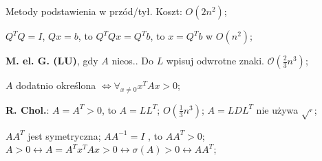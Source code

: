 
\entry
Metody podstawienia w przód/tył. Koszt: $O(2n^2)$;

\entry
$Q^TQ=I$, $Qx=b$, to $Q^TQx=Q^Tb$, to $x=Q^Tb$ w $O(n^2)$;




\entry
\textbf{M. el. G. (LU)}, gdy $A$ nieos..
Do $L$ wpisuj odwrotne znaki.
$\mathcal{O}(\frac{2}{3}n^3)$;

\entry
$A$ dodatnio określona $\iff \forall_{x \neq 0} x^TAx>0$;

\entry
\textbf{R. Chol.}:
$A=A^T>0$,
to
$A=LL^T$;
$O(\frac{1}{3}n^3)$;
$A=LDL^T$
nie używa
$\sqrt{\cdot}$;

\entry
$AA^T$ jest symetryczna;
\entry
$AA^{-1}=I$ , to $AA^T>0$;
\entry
$
A>0
\leftrightarrow A=A^Tx^TAx > 0
\leftrightarrow \sigma(A) > 0
\leftrightarrow AA^T
$;
